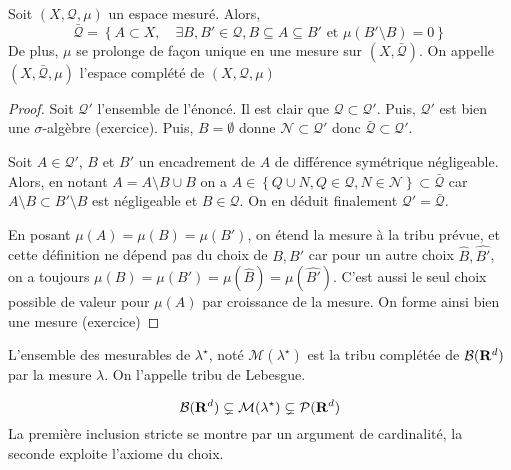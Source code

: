 \begin{prop}
    Soit $(X, \mathcal  Q, \mu)$ un espace mesuré. Alors, \[
        \bar{\mathcal  Q} = \left\{ A\subset X, \quad  \exists B,B' \in  \mathcal  Q, B\subseteq A\subseteq B'\text{ et } \mu(B'\setminus  B)=0 \right\} 
    \] 
    De plus, $\mu$ se prolonge de façon unique en une mesure sur  $(X, \bar{\mathcal  Q})$. On appelle $(X, \bar{\mathcal  Q}, \mu)$ l'espace complété de $(X, \mathcal  Q, \mu)$
\end{prop}

\begin{proof}
    Soit $\mathcal  Q'$ l'ensemble de l'énoncé. Il est clair que $\mathcal  Q\subset \mathcal  Q'$. Puis, $\mathcal  Q'$ est bien une $\sigma$-algèbre (exercice). Puis,  $B=\emptyset$ donne  $\mathcal  N\subset  \mathcal  Q'$ donc $\bar{\mathcal  Q}\subset \mathcal  Q'$.

    Soit $A \in  \mathcal Q'$, $B$ et  $B'$ un encadrement de  $A$ de différence symétrique négligeable. Alors, en notant  $A=A \setminus  B\cup B$ on a $A \in  \left\{ Q\cup N, Q \in  \mathcal  Q, N \in  \mathcal  N \right\}\subset \bar{\mathcal  Q} $ car $A \setminus  B\subset B'\setminus  B$ est négligeable et $B \in  \mathcal  Q$. On en déduit finalement $\mathcal  Q'=\bar{\mathcal  Q}$.

    En posant $\mu(A)=\mu(B)=\mu(B')$, on étend la mesure à la tribu prévue, et cette définition ne dépend pas du choix de  $B, B'$ car pour un autre choix  $\hat{B},\hat{B'}$, on a toujours $\mu(B)=\mu(B')=\mu(\hat{B})=\mu(\hat{B'})$. C'est aussi le seul choix possible de valeur pour $\mu(A)$ par croissance de la mesure. On forme ainsi bien une mesure (exercice)
\end{proof}

\begin{thm}
    L'ensemble des mesurables de  $\lambda^\star$, noté  $\mathcal  M(\lambda^\star)$ est la tribu complétée de $\mathcal B(\mathbf R^d)$ par la mesure $\lambda$. On l'appelle tribu de Lebesgue.
\end{thm}

\begin{rem}
\[
    \mathcal  B(\mathbf R^d)\subsetneq \mathcal  M(\lambda^\star) \subsetneq \mathcal  P(\mathbf R^d)
\] 
La première inclusion stricte se montre par un argument de cardinalité, la seconde exploite l'axiome du choix.
\end{rem}

